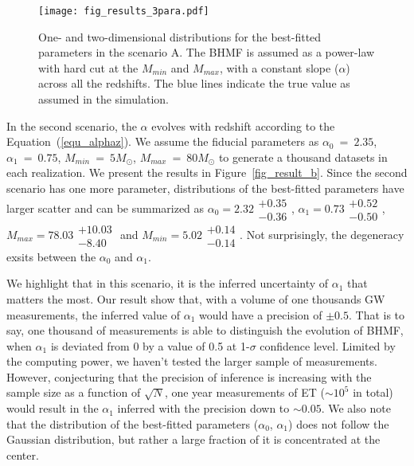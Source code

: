 \documentclass[twocolumn]{aastex62}
\begin{document}
\begin{figure}%
\texttt{[image: fig\_results\_3para.pdf]}
\caption{
One- and two-dimensional distributions for the best-fitted parameters in the scenario A. The BHMF is assumed as a power-law with hard cut at the $M_{min}$ and $M_{max}$, with a constant slope ($\alpha$) across all the redshifts. The blue lines indicate the true value as assumed in the simulation.
}
\label{fig_result_a}
\end{figure}

In the second scenario, the $\alpha$ evolves with redshift according to the Equation~(\ref{equ_alphaz}). We assume the fiducial parameters as $\alpha_0~=~2.35$, $\alpha_1~=~0.75$, $M_{min}~=~5M_{\odot}$, $M_{max}~=~80M_{\odot}$ to generate a thousand datasets in each realization. We present the results in Figure~\ref{fig_result_b}. Since the second scenario has one more parameter, distributions of the best-fitted parameters have larger scatter and can be summarized as $\alpha_0 = 2.32\substack{+0.35\\-0.36}$, $\alpha_1 = 0.73\substack{+0.52\\-0.50}$, $M_{max} = 78.03\substack{+10.03\\-8.40}$ and  $M_{min} = 5.02\substack{+0.14\\-0.14}$. Not surprisingly, the degeneracy exsits between the $\alpha_0$ and $\alpha_1$. 

We highlight that in this scenario, it is the inferred uncertainty of $\alpha_1$ that matters the most. Our result show that, with a volume of one thousands GW measurements, the inferred value of $\alpha_1$ would have a precision of $\pm0.5$. That is to say, one thousand of measurements is able to distinguish the evolution of BHMF, when $\alpha_1$ is deviated from 0 by a value of 0.5 at 1-$\sigma$ confidence level. Limited by the computing power, we haven't tested the larger sample of measurements. However, conjecturing that the precision of inference is increasing with the sample size as a function of $\sqrt{N}$, one year measurements of ET ($\sim10^5$ in total) would result in the $\alpha_1$ inferred with the precision down to $\sim0.05$.
We also note that the distribution of the best-fitted parameters ($\alpha_0$, $\alpha_1$) does not follow the Gaussian distribution, but rather a large fraction of it is concentrated at the center. 
\end{document}

